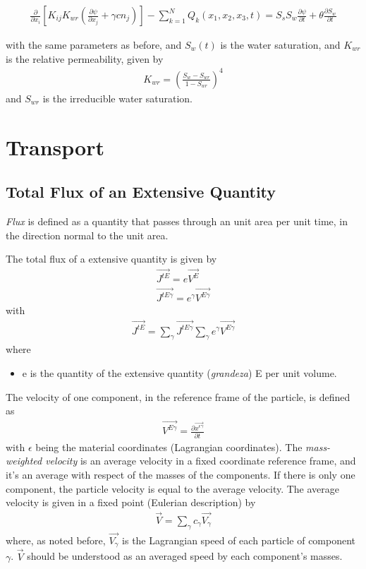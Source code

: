 \documentclass[11pt,twoside]{report}
\begin{document}
\begin{align}
      \frac{\partial}{\partial x_{i}}\left[ K_{ij}K_{wr}\left(\frac{\partial \psi}{\partial x_{j}} + \gamma c n_{j} \right)\right] - \sum_{k=1}^{N}Q_{k}(x_{1},x_{2},x_{3},t) = S_{s}S_{w}\frac{\partial \psi}{\partial t} + \theta\frac{\partial S_{w}}{\partial t}
\end{align}

with the same parameters as before, and $S_{w}(t)$ is the water saturation, and $K_{wr}$ is the relative permeability, given by
\begin{align}
   K_{wr} = \left(\frac{S_{w} - S_{wr}}{1-S_{wr}}\right)^{4}
\end{align}
and $S_{wr}$ is the irreducible water saturation.

\section{Transport}

\subsection{Total Flux of an Extensive Quantity}
\textit{Flux} is defined as a quantity that passes through an unit area per unit time, in the direction normal to the unit area.

The total flux of a extensive quantity is given by
\begin{align}
   \vec{J^{tE}} = e\vec{V^{E}} \\
   \vec{J^{tE\gamma}} = e^{\gamma}\vec{V^{E\gamma}}
\end{align}
with
\begin{align}
   \vec{J^{tE}} = \sum_{\gamma} \vec{J^{tE\gamma}} \sum_{\gamma} e^{\gamma}\vec{V^{E\gamma}}
\end{align}
where
\begin{itemize}
   \item e is the quantity of the extensive quantity (\textit{grandeza}) E per unit volume.
\end{itemize}

The velocity of one component, in the reference frame of the particle, is defined as
\begin{align}
   \vec{V^{E\gamma}} = \frac{\partial \vec{x^{\epsilon \gamma}}}{\partial t}
\end{align}
with $\epsilon$ being the material coordinates (Lagrangian coordinates). The \textit{mass-weighted velocity} is an average velocity in a fixed coordinate reference frame, and it's an average with respect of the masses of the components. If there is only one component, the particle velocity is equal to the average velocity. The average velocity is given in a fixed point (Eulerian description) by
\begin{align}
   \vec{V} = \sum_{\gamma}c_{\gamma}\vec{V_{\gamma}}
\end{align}
where, as noted before, $\vec{V_{\gamma}}$ is the Lagrangian speed of each particle of component $\gamma$. $\vec{V}$ should be understood as an averaged speed by each component's masses. 
\end{document}
